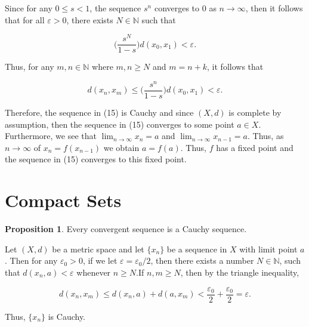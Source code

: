 \documentclass{article}
\makeatletter
\theoremstyle{definition}
\newtheorem{prop}{Proposition}[section]
\theoremstyle{remark}
\let\oldproofname=\proofname
\renewcommand{\proofname}{\bf{\textit{\oldproofname}}}
\theoremstyle{definition}
\renewenvironment{proof}[1][\proofname]{\par
  \pushQED{\qed}%
  \normalfont \topsep6\p@\@plus6\p@\relax
  \list{}{\leftmargin=0mm
          \rightmargin=0mm
          \settowidth{\itemindent}{\itshape#1}%
          \labelwidth=\itemindent
          \parsep=0pt \listparindent=0mm%
  }
  \item[\hskip\labelsep
        \itshape
    #1\@addpunct{.}]\ignorespaces
}{%
  \popQED\endlist\@endpefalse
}
\makeatother
\begin{document}
\begin{proof}
        Since for any $0\leq s<1$, the sequence $s^n$  converges to 0 as $n\rightarrow\infty$, then it follows that for all $\varepsilon>0$, there exists $N\in\mathbb{N}$ such that 
        
        \begin{equation*}
            \bigg(\frac{s^N}{1-s}\bigg)d(x_0,x_1)<\varepsilon.
        \end{equation*}
        
        Thus, for any $m,n\in\mathbb{N}$ where $m,n\geq N$ and $m=n+k$, it follows that 
        
        \begin{equation*}
            d(x_n,x_m)\leq\bigg(\frac{s^n}{1-s}\bigg)d(x_0,x_1)<\varepsilon.
        \end{equation*}
        
        \hspace{4mm}Therefore, the sequence in (15) is Cauchy and since $(X,d)$ is complete by assumption, then the sequence in (15) converges to some point $a\in X$. Furthermore, we see that $\lim_{n\rightarrow\infty}x_n=a$ and $\lim_{n\rightarrow\infty}x_{n-1}=a$. Thus, as $n\rightarrow\infty$ of $x_n=f(x_{n-1})$ we obtain $a=f(a)$. Thus, $f$ has a fixed point and the sequence in (15) converges to this fixed point.
    \end{proof}

\section{Compact Sets}

\begin{prop}\label{prop:2.1}
    Every convergent sequence is a Cauchy sequence.
\end{prop}

\begin{proof}
    Let $(X,d)$ be a metric space and let $\{x_n\}$ be a sequence in $X$ with limit point $a$. Then for any $\varepsilon_0>0$, if we let $\varepsilon=\varepsilon_0/2$, then there exists a number $N\in\mathbb{N}$, such that $d(x_n,a)<\varepsilon$ whenever $n\geq N$.If $n,m\geq N$, then by the triangle inequality,
    
    \begin{equation*}
        d(x_n,x_m)\leq d(x_n,a)+d(a,x_m)<\frac{\varepsilon_0}{2}+\frac{\varepsilon_0}{2}=\varepsilon.
    \end{equation*}
    
    Thus, $\{x_n\}$ is Cauchy.
\end{proof}
\end{document}

